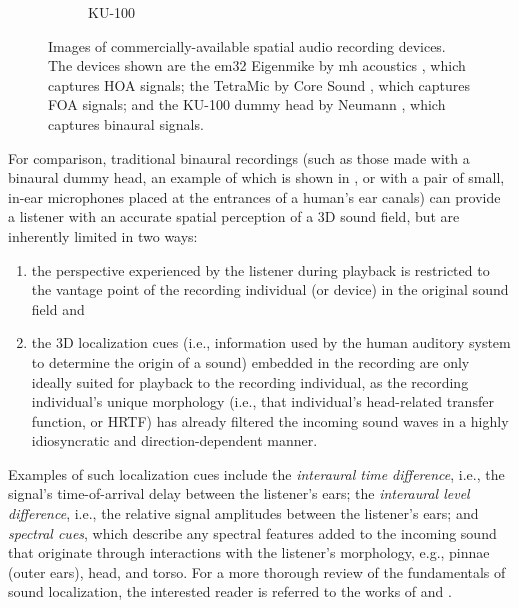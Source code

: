 \begin{figure}[t]
\begin{subfigure}[b]{0.3\textwidth}
        \caption{KU-100}
        \label{fig:01_Introduction:KU100}
    \end{subfigure}
    \caption[Images of commercially-available spatial audio recording devices.]{
    Images of commercially-available spatial audio recording devices.
    The devices shown are
    the em32 Eigenmike by mh acoustics \citep{EigenmikeURL}, which captures HOA signals;
    the TetraMic by Core Sound \citep{TetraMicURL}, which captures FOA signals; and
    the KU-100 dummy head by Neumann \citep{NeumannKU100URL}, which captures binaural signals.
    }
\end{figure}

For comparison, traditional binaural recordings (such as those made with a binaural dummy head, an example of which is shown in , or with a pair of small, in-ear microphones placed at the entrances of a human's ear canals) can provide a listener with an accurate spatial perception of a 3D sound field, but are inherently limited in two ways:
\begin{enumerate}
    \item the perspective experienced by the listener during playback is restricted to the vantage point of the recording individual (or device) in the original sound field and
    \item the 3D localization cues (i.e., information used by the human auditory system to determine the origin of a sound) embedded in the recording are only ideally suited for playback to the recording individual, as the recording individual's unique morphology (i.e., that individual's head-related transfer function, or HRTF) has already filtered the incoming sound waves in a highly idiosyncratic and direction-dependent manner.
\end{enumerate}
Examples of such localization cues include the \textit{interaural time difference}, i.e., the signal's time-of-arrival delay between the listener's ears; the \textit{interaural level difference}, i.e., the relative signal amplitudes between the listener's ears; and \textit{spectral cues}, which describe any spectral features added to the incoming sound that originate through interactions with the listener's morphology, e.g., pinnae (outer ears), head, and torso.
For a more thorough review of the fundamentals of sound localization, the interested reader is referred to the works of \citet[chapter 2]{Blauert1997} and \citet[section 1.4]{Xie2013}.

